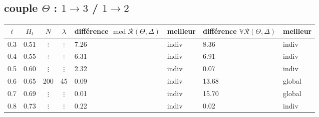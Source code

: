 \pagebreak
\subsection{couple $\Theta$ : $1 \rightarrow 3$ / $1 \rightarrow 2$}

\begin{table}[H]
\centering
\begin{tabularx}{\textwidth}{ccccXXXX}
	\toprule
	$t$ & $H_t$ & $N$      & $\lambda$ & différence $\operatorname{med} \mathcal R(\Theta, \Delta)$ & \textbf{meilleur} & différence  $\mathds V \mathcal R(\Theta, \Delta)$ & \textbf{meilleur} \\
	\midrule

	0.3 & 0.51  & $\vdots$ & $\vdots$  & 7.26                                                       & indiv             & 8.36                                               & indiv             \\
	0.4 & 0.55  & $\vdots$ & $\vdots$  & 6.31                                                       & indiv             & 6.91                                               & indiv             \\
	0.5 & 0.60  & $\vdots$ & $\vdots$  & 2.32                                                       & indiv             & 0.07                                               & indiv             \\
	0.6 & 0.65  & 200      & 45        & 0.09                                                       & indiv             & 13.68                                              & global            \\
	0.7 & 0.69  & $\vdots$ & $\vdots$  & 0.01                                                       & indiv             & 15.70                                              & global            \\
	0.8 & 0.73  & $\vdots$ & $\vdots$  & 0.22                                                       & indiv             & 0.02                                               & indiv             \\

	\midrule


\end{tabularx}
\end{table}
